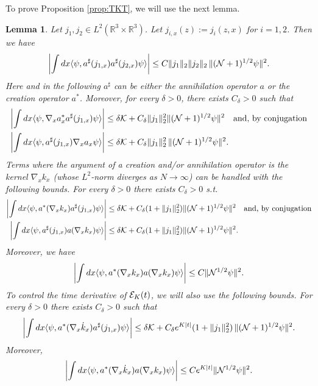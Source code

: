 \documentclass[11pt,a4paper]{article}
\newtheorem{lemma}[thm]{Lemma}
\newcommand{\ech}[2]{#2}	%
\newcommand{\ekt}{e^{K\lvert t\rvert}}	%
\newcommand{\bR}{{\mathbb R}}
\newcommand{\cE}{{\cal E}}
\newcommand{\cK}{{\cal K}}
\newcommand{\cN}{{\cal N}}
\begin{document}
To prove Proposition \ref{prop:TKT}, we will use the next lemma. 
\begin{lemma}\label{lm:K}
Let $j_1, j_2 \in L^2 (\bR^3 \times \bR^3)$. Let $j_{i,x} (z) := j_i (z,x)$ for $i =1,2$. Then we have
\begin{equation}\label{eq:lmK-1}
\left| \int dx \langle \psi , a^\sharp (j_{1,x}) a^\sharp (j_{2,x}) \psi \rangle \right| \leq C \| j_1 \|_2 \| j_2 \|_2  \, \| (\cN+1)^{1/2} \psi \|^2. 
\end{equation}
Here and in the following $a^\sharp$ can be either the annihilation operator $a$ or the creation operator $a^*$. Moreover, for every $\delta > 0$, there exists $C_\delta > 0$ such that 
\begin{equation}\label{eq:lmK-2}
\begin{split}
\left| \int dx \langle \psi , \nabla_x a_x^* a^\sharp (j_{1,x}) \psi \rangle \right| &\leq\delta \cK +  C_\delta \| j_1 \|^2_2  \| (\cN+1)^{1/2} \psi \|^2  \quad \text{and, by conjugation} \\
\left| \int dx \langle \psi , a^\sharp (j_{1,x}) \nabla_x a_x  \psi \rangle \right| &\leq \delta \cK +  C_\delta \| j_1 \|_2^2 \, \| (\cN+1)^{1/2} \psi \|^2. \end{split} \end{equation}
Terms where the argument of a creation and/or annihilation operator is the kernel $\nabla_x k_x$ (whose $L^2$-norm diverges as $N \to \infty$) can be handled with the following bounds. For every $\delta > 0$ there exists $C_\delta >0$ s.t. 
\begin{equation}\label{eq:lmK-3}
\begin{split}
\left| \int dx \langle \psi , a^* (\nabla_x k_x) a^\sharp (j_{1,x}) \psi \rangle \right| & \leq \delta \cK + C_\delta  (1+\| j_1 \|^2_2) \| (\cN+1)^{1/2} \psi \|^2 \quad \text{and, by conjugation} \\
\left| \int dx \langle \psi , a^\sharp (j_{1,x}) a (\nabla_x k_x)  \psi \rangle \right| & \leq \delta \cK + C_\delta (1+\| j_1 \|^2_2) \| (\cN+1)^{1/2} \psi \|^2.
\end{split}
\end{equation}
Moreover, we have
\begin{equation}\label{eq:lmK-4}
\left| \int dx \langle \psi , a^* (\nabla_x k_x) a (\nabla_x k_x) \psi
\rangle \right| \leq C \| \cN^{1/2} \psi \|^2.
\end{equation}
To control the time derivative of $\cE_K (t)$, we will also use the following bounds. For every $\delta > 0$ there exists $C_\delta > 0$ such that 
\begin{equation}\label{eq:lmK-5} \left| \int dx \langle \psi , a^* (\nabla_x \dot{k}_x) a^\sharp (j_{1,x}) \psi \rangle \right| \leq \delta \cK + C_\delta \ech{\, \| \varphi_t^{(N)} \|_{H^3}^2}{\ekt}(1+\| j_1 \|^2_2) \, \| (\cN+1)^{1/2} \psi \|^2 .
\end{equation}
Moreover,
\begin{equation}\label{eq:lmK-6} 
\left| \int dx \langle \psi , a^* (\nabla_x \dot{k}_x) a (\nabla_x k_x) \psi \rangle \right| \leq C \ech{\| \varphi_t^{(N)} \|_{H^3}^2}{\ekt}  \| \cN^{1/2} \psi \|^2. \end{equation}
\end{lemma}
\end{document}
